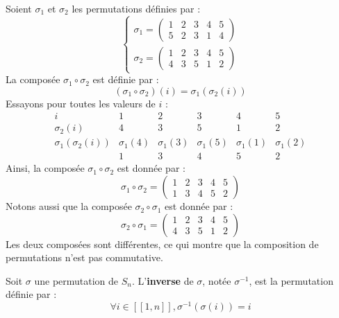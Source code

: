 \documentclass[12pt, a4paper]{report}
\begin{document}
\begin{example}
    Soient $\sigma_1$ et $\sigma_2$ les permutations définies par :
    $$
    \begin{cases}
        \sigma_1 = \left(\begin{matrix} 1 & 2 & 3 & 4 & 5 \\ 5 & 2 & 3 & 1 & 4 \end{matrix}\right) \\
        \sigma_2 = \left(\begin{matrix} 1 & 2 & 3 & 4 & 5 \\ 4 & 3 & 5 & 1 & 2 \end{matrix}\right)
    \end{cases}
    $$
    La composée $\sigma_1 \circ \sigma_2$ est définie par :
    $$
    (\sigma_1 \circ \sigma_2)(i) = \sigma_1(\sigma_2(i))
    $$
    Essayons pour toutes les valeurs de $i$ :
    \[
    \begin{array}{c|ccccc}
        i & 1 & 2 & 3 & 4 & 5 \\
        \hline
        \sigma_2(i) & 4 & 3 & 5 & 1 & 2 \\
        \sigma_1(\sigma_2(i)) & \sigma_1(4) & \sigma_1(3) & \sigma_1(5) & \sigma_1(1) & \sigma_1(2) \\
        & 1 & 3 & 4 & 5 & 2
    \end{array}
    \]
    Ainsi, la composée $\sigma_1 \circ \sigma_2$ est donnée par :
    $$
    \sigma_1 \circ \sigma_2 = \left(\begin{matrix} 1 & 2 & 3 & 4 & 5 \\ 1 & 3 & 4 & 5 & 2 \end{matrix}\right)
    $$
    Notons aussi que la composée $\sigma_2 \circ \sigma_1$ est donnée par :
    $$
    \sigma_2 \circ \sigma_1 = \left(\begin{matrix} 1 & 2 & 3 & 4 & 5 \\ 4 & 3 & 5 & 1 & 2 \end{matrix}\right)
    $$
    Les deux composées sont différentes, ce qui montre que la composition de permutations n'est pas commutative.
\end{example}

\begin{definition}
    Soit $\sigma$ une permutation de $S_n$. L'\textbf{inverse} de $\sigma$, notée $\sigma^{-1}$, est la permutation définie par :
    $$\forall i \in [\![1,n]\!], \sigma^{-1}(\sigma(i)) = i$$
\end{definition}
\end{document}
